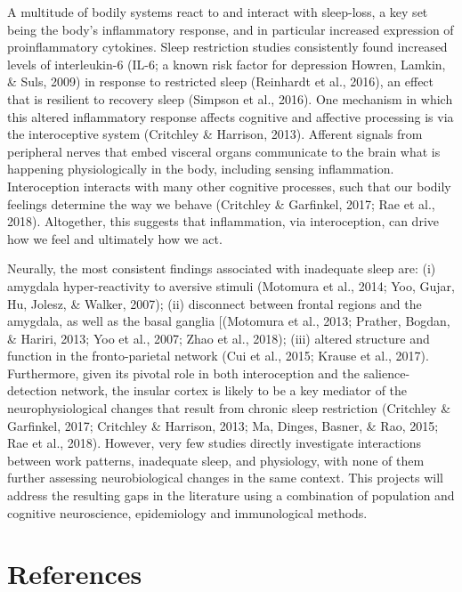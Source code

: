 \documentclass[
  english,
  man]{apa6}
\begin{document}
A multitude of bodily systems react to and interact with sleep-loss, a key set being the body's inflammatory response, and in particular increased expression of proinflammatory cytokines. Sleep restriction studies consistently found increased levels of interleukin-6 (IL-6; a known risk factor for depression Howren, Lamkin, \& Suls, 2009) in response to restricted sleep (Reinhardt et al., 2016), an effect that is resilient to recovery sleep (Simpson et al., 2016). One mechanism in which this altered inflammatory response affects cognitive and affective processing is via the interoceptive system (Critchley \& Harrison, 2013). Afferent signals from peripheral nerves that embed visceral organs communicate to the brain what is happening physiologically in the body, including sensing inflammation. Interoception interacts with many other cognitive processes, such that our bodily feelings determine the way we behave (Critchley \& Garfinkel, 2017; Rae et al., 2018). Altogether, this suggests that inflammation, via interoception, can drive how we feel and ultimately how we act.

Neurally, the most consistent findings associated with inadequate sleep are: (i) amygdala hyper-reactivity to aversive stimuli (Motomura et al., 2014; Yoo, Gujar, Hu, Jolesz, \& Walker, 2007); (ii) disconnect between frontal regions and the amygdala, as well as the basal ganglia {[}(Motomura et al., 2013; Prather, Bogdan, \& Hariri, 2013; Yoo et al., 2007; Zhao et al., 2018); (iii) altered structure and function in the fronto-parietal network (Cui et al., 2015; Krause et al., 2017). Furthermore, given its pivotal role in both interoception and the salience-detection network, the insular cortex is likely to be a key mediator of the neurophysiological changes that result from chronic sleep restriction (Critchley \& Garfinkel, 2017; Critchley \& Harrison, 2013; Ma, Dinges, Basner, \& Rao, 2015; Rae et al., 2018). However, very few studies directly investigate interactions between work patterns, inadequate sleep, and physiology, with none of them further assessing neurobiological changes in the same context. This projects will address the resulting gaps in the literature using a combination of population and cognitive neuroscience, epidemiology and immunological methods.

\newpage

\hypertarget{references}{%
\section{References}\label{references}}
\end{document}
